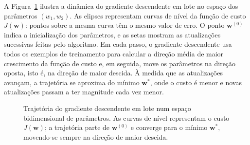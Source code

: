 \documentclass[12pt,a4paper]{article}
\begin{document}
A Figura~\ref{fig:gd} ilustra a dinâmica do gradiente descendente em lote no espaço dos parâmetros $(w_1,w_2)$. As elipses representam curvas de nível da função de custo $J(\mathbf{w})$: pontos sobre a mesma curva têm o mesmo valor de erro. O ponto $\mathbf{w}^{(0)}$ indica a inicialização dos parâmetros, e as setas mostram as atualizações sucessivas feitas pelo algoritmo. Em cada passo, o gradiente descendente usa todos os exemplos de treinamento para calcular a direção média de maior crescimento da função de custo e, em seguida, move os parâmetros na direção oposta, isto é, na direção de maior descida. À medida que as atualizações avançam, a trajetória se aproxima do mínimo $\mathbf{w}^*$, onde o custo é menor e novas atualizações passam a ter magnitude cada vez menor.

\begin{figure}[ht]
\centering
{}
\caption{Trajetória do gradiente descendente em lote num espaço bidimensional de parâmetros. As curvas de nível representam o custo $J(\mathbf{w})$; a trajetória parte de $\mathbf{w}^{(0)}$ e converge para o mínimo $\mathbf{w}^*$, movendo-se sempre na direção de maior descida.}
\label{fig:gd}
\end{figure}
\end{document}
